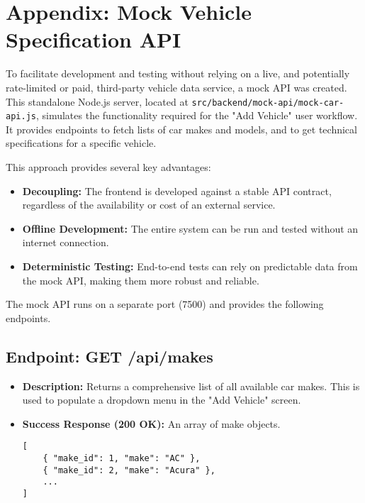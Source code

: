 \chapter{Appendix: Mock Vehicle Specification API}

To facilitate development and testing without relying on a live, and potentially rate-limited or paid, third-party vehicle data service, a mock API was created. This standalone Node.js server, located at \texttt{src/backend/mock-api/mock-car-api.js}, simulates the functionality required for the "Add Vehicle" user workflow. It provides endpoints to fetch lists of car makes and models, and to get technical specifications for a specific vehicle.

This approach provides several key advantages:
\begin{itemize}
    \item \textbf{Decoupling:} The frontend is developed against a stable API contract, regardless of the availability or cost of an external service.
    \item \textbf{Offline Development:} The entire system can be run and tested without an internet connection.
    \item \textbf{Deterministic Testing:} End-to-end tests can rely on predictable data from the mock API, making them more robust and reliable.
\end{itemize}

The mock API runs on a separate port (7500) and provides the following endpoints.

\section{Endpoint: GET /api/makes}
\begin{itemize}
    \item \textbf{Description:} Returns a comprehensive list of all available car makes. This is used to populate a dropdown menu in the "Add Vehicle" screen.
    \item \textbf{Success Response (200 OK):} An array of make objects.
    \begin{verbatim}
[
    { "make_id": 1, "make": "AC" },
    { "make_id": 2, "make": "Acura" },
    ...
]
    \end{verbatim}
\end{itemize}


